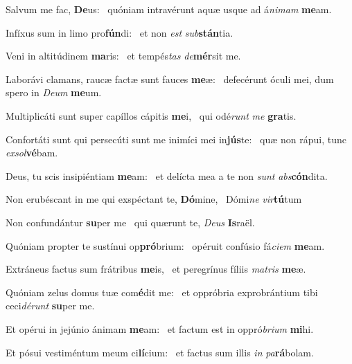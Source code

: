 \item Salvum me fac, \textbf{De}us:~\psstar{} quóniam intravérunt aquæ usque ad á\textit{nimam} \textbf{me}am.

\item Infíxus sum in limo pro\textbf{fún}di:~\psstar{} et non \textit{est} \textit{sub}\textbf{stán}tia.

\item Veni in altitúdinem \textbf{ma}ris:~\psstar{} et tempés\textit{tas} \textit{de}\textbf{mér}sit me.

\item Laborávi clamans, raucæ factæ sunt fauces \textbf{me}æ:~\psstar{} defecérunt óculi mei, dum spero in \textit{Deum} \textbf{me}um.

\item Multiplicáti sunt super capíllos cápitis \textbf{me}i,~\psstar{} qui odé\textit{runt} \textit{me} \textbf{gra}tis.

\item Confortáti sunt qui persecúti sunt me inimíci mei in\textbf{jús}te:~\psstar{} quæ non rápui, tunc \textit{exsol}\textbf{vé}bam.

\item Deus, tu scis insipiéntiam \textbf{me}am:~\psstar{} et delícta mea a te non \textit{sunt} \textit{abs}\textbf{cón}dita.

\item Non erubéscant in me qui exspéctant te, \textbf{Dó}mine,~\psstar{} Dómi\textit{ne} \textit{vir}\textbf{tú}tum

\item Non confundántur \textbf{su}per me~\psstar{} qui quærunt te, \textit{Deus} \textbf{Is}raël.

\item Quóniam propter te sustínui op\textbf{pró}brium:~\psstar{} opéruit confúsio fá\textit{ciem} \textbf{me}am.

\item Extráneus factus sum frátribus \textbf{me}is,~\psstar{} et peregrínus fíliis \textit{matris} \textbf{me}æ.

\item Quóniam zelus domus tuæ com\textbf{é}dit me:~\psstar{} et oppróbria exprobrántium tibi ceci\textit{dérunt} \textbf{su}per me.

\item Et opérui in jejúnio ánimam \textbf{me}am:~\psstar{} et factum est in oppró\textit{brium} \textbf{mi}hi.

\item Et pósui vestiméntum meum ci\textbf{lí}cium:~\psstar{} et factus sum illis \textit{in} \textit{pa}\textbf{rá}bolam.

